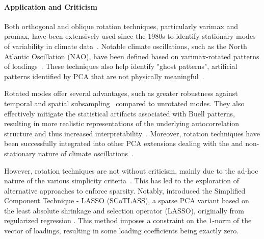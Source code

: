 \paragraph{Application and Criticism} Both orthogonal and oblique rotation techniques, particularly varimax and promax, have been extensively used since the 1980s to identify stationary modes of variability in climate data~\cite[e.g.][]{horel_rotated_1981,barnston_classification_1987,lim_east_2015,gao_impacts_2017,mezzina_dynamics_2020,huth_how_2021,lee_quantifying_2019}. Notable climate oscillations, such as the North Atlantic Oscillation (NAO), have been defined based on varimax-rotated patterns of loadings~\cite{barnston_classification_1987}. These techniques also help identify "ghost patterns", artificial patterns identified by PCA that are not physically meaningful~\cite{lian_evaluation_2012,huth_how_2021}.

Rotated modes offer several advantages, such as greater robustness against temporal and spatial subsampling~\cite{cheng_robustness_1995} compared to unrotated modes. They also effectively mitigate the statistical artifacts associated with Buell patterns, resulting in more realistic representations of the underlying autocorrelation structure and thus increased interpretability~\cite{richman_climatic_1985,richman_rotation_1986,lian_evaluation_2012}. Moreover, rotation techniques have been successfully integrated into other PCA extensions dealing with the  and non-stationary nature of climate oscillations~\cite{horel_complex_1984,bueso_nonlinear_2020,guilloteau_rotated_2020}.

However, rotation techniques are not without criticism, mainly due to the ad-hoc nature of the various simplicity criteria~\cite[cf.][pp. 270-274]{jolliffe_principal_2002}. This has led to the exploration of alternative approaches to enforce sparsity. Notably, \citet{jolliffe_simplified_2002} introduced the Simplified Component Technique - LASSO (SCoTLASS), a sparse PCA variant based on the least absolute shrinkage and selection operator (LASSO), originally from regularized regression \cite{tibshirani_regression_1996}. This method imposes a constraint on the $1$-norm of the vector of loadings, resulting in some loading coefficients being exactly zero.

